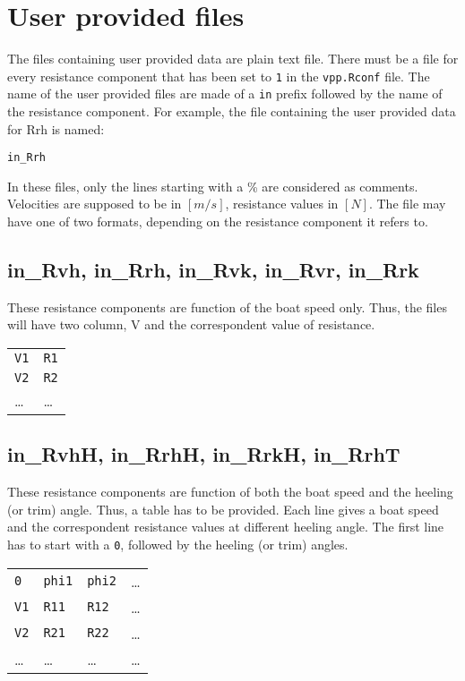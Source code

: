 \documentclass[a4paper,openany]{memoir}
\begin{document}
\chapter{User provided files}
\label{chapter_UserProvidedFiles}

The files containing user provided data are plain text file. There must be a file for every resistance component that has been set to \texttt{1} in the \texttt{vpp.Rconf} file.
The name of the user provided files are made of a \texttt{in} prefix followed by the name of the resistance component. For example, the file containing the user provided data for Rrh is named:
\begin{center} 
  \texttt{in\_Rrh} 
\end{center}
In these files, only the lines starting with a \% are considered as comments.
Velocities are supposed to be in $[m/s]$, resistance values in $[N]$.
The file may have one of two formats, depending on the resistance component it refers to.


\section{in\_Rvh, in\_Rrh, in\_Rvk, in\_Rvr, in\_Rrk}

These resistance components are function of the boat speed only. Thus, the files will have two column, V and the correspondent value of resistance.\\

\begin{table}[h]
  \centering
  \begin{tabular}{l l}
    \texttt{V1} & \texttt{R1}\\
    \texttt{V2} & \texttt{R2}\\
    \dots & \dots \\
  \end{tabular}
\end{table}


\section{in\_RvhH, in\_RrhH, in\_RrkH, in\_RrhT}
These resistance components are function of both the boat speed and the heeling (or trim) angle. Thus, a table has to be provided. Each line gives a boat speed and the correspondent resistance values at different heeling angle. The first line has to start with a \texttt{0}, followed by the heeling (or trim) angles.

\begin{table}[h]
  \centering
  \begin{tabular}{l l l l}
    \texttt{0} 	& \texttt{phi1} & \texttt{phi2} & \dots \\
    \texttt{V1} 	& \texttt{R11} 	& \texttt{R12} 	& \dots \\
    \texttt{V2} 	& \texttt{R21} 	& \texttt{R22}	& \dots \\
    \dots 		& \dots 	& \dots 	& \dots \\
  \end{tabular}
\end{table}
\end{document}
